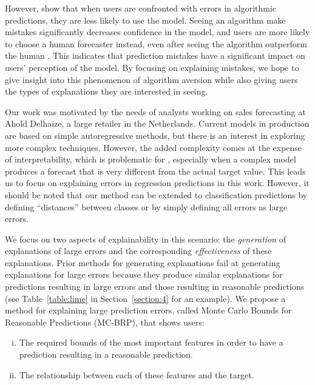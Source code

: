 However, \citet{dietvorst-2015-aa} show that when users are confronted with errors in algorithmic predictions, they are less likely to use the model. 
Seeing an algorithm make mistakes significantly decreases confidence in the model, and users are more likely to choose a human forecaster instead, even after seeing the algorithm outperform the human \citep{dietvorst-2015-aa}. 
This indicates that prediction mistakes have a significant impact on users' perception of the model. 
By focusing on explaining mistakes, we hope to give insight into this phenomenon of algorithm aversion while also giving users the types of explanations they are interested in seeing. 

Our work was motivated by the needs of analysts working on sales forecasting at Ahold Delhaize, a large retailer in the Netherlands. 
Current models in production are based on simple autoregressive methods, but there is an interest in exploring more complex techniques. 
However, the added complexity comes at the expense of interpretability, which is problematic for \OurCompany{}, especially when a complex model produces a forecast that is very different from the actual target value. 
This leads us to focus on explaining errors in regression predictions in this work. 
However, it should be noted that our method can be extended to classification predictions by defining ``distances'' between classes or by simply defining all errors as large errors. 

We focus on two aspects of explainability in this scenario: the \emph{generation} of explanations of large errors and the corresponding \emph{effectiveness} of these explanations. 
Prior methods for generating explanations fail at generating explanations for large errors because they produce similar explanations for predictions resulting in large errors and those resulting in reasonable predictions (see Table~\ref{table:lime} in Section~\ref{section:4} for an example). 
We propose a method for explaining large prediction errors, called Monte Carlo Bounds for Reasonable Predictions (MC-BRP), that shows users: 
\begin{enumerate}[(i)]
\item The required bounds of the most important features in order to have a prediction resulting in a reasonable prediction.
\item The relationship between each of these features and the target.
\end{enumerate}
\pagebreak

